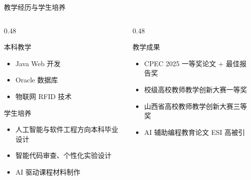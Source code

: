 \documentclass{beamer}
\newcommand{\tightitems}{\setlength\itemsep{2pt}}
\begin{document}
\begin{frame}{教学经历与学生培养}
\footnotesize
\begin{columns}[T]
\begin{column}{0.48\textwidth}
\begin{block}{本科教学}
\begin{itemize}\tightitems
  \item Java Web 开发
  \item Oracle 数据库
  \item 物联网 RFID 技术
\end{itemize}
\end{block}
\begin{block}{学生培养}
\begin{itemize}\tightitems
  \item 人工智能与软件工程方向本科毕业设计
  \item 智能代码审查、个性化实验设计
  \item AI 驱动课程材料制作
\end{itemize}
\end{block}
\end{column}
\begin{column}{0.48\textwidth}
\begin{block}{教学成果}
\begin{itemize}\tightitems
  \item CPEC 2025 一等奖论文 + 最佳报告奖
  \item 校级高校教师教学创新大赛一等奖
  \item 山西省高校教师教学创新大赛三等奖
  \item AI 辅助编程教育论文 ESI 高被引
\end{itemize}
\end{block}
\end{column}
\end{columns}
\end{frame}
\end{document}
